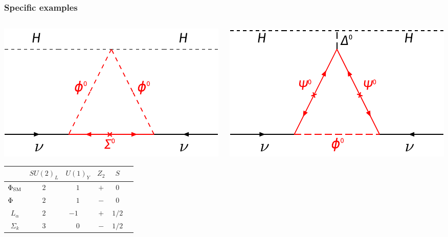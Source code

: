 \documentclass[%
xcolor=dvipsnames,table%
]{beamer}
\begin{document}
  





\begin{frame}
  \frametitle{Specific examples}

\vspace{0.2cm}

\begin{columns}
  \begin{column}{0.5\textwidth}
    \includegraphics[scale=0.7]{rs_iii}

\begin{tabular}{|c||c|c|c|c|c|}
\hline 
&  $SU(2)_{L}$ & $  U(1)_{Y}$   & $Z_2$ & $S$
\\ \hline \hline 
 $\Phi_{\rm SM}$  & $2$&$ 1$ & $+$ & $0$ \\
\hline
 $\Phi\phantom{_{\rm SM}}$ & $2$&$ 1$  & $-$ & $0$ \\
\hline
 ${L_\alpha}$  & $2$&$-1\phantom{-} $ & $+$ & $1/2$ \\
\hline 
 ${\Sigma}_{k}$ & $3$&$ 0$  & $-$ & $1/2$ \\ 
\hline
\end{tabular} 
  \end{column}
  \begin{column}{0.5\textwidth}
        \includegraphics[scale=0.7]{rs_ii}



\end{column}
\end{columns}
\end{frame}
\end{document}
